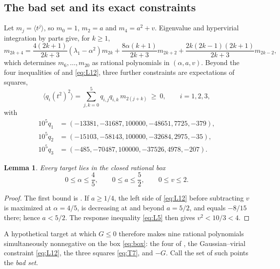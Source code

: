 \documentclass[11pt,reqno]{amsart}
\theoremstyle{plain}
\newtheorem{lemma}[theorem]{Lemma}
\theoremstyle{definition}
\theoremstyle{remark}
\numberwithin{equation}{section}
\begin{document}
\subsection{The bad set and its exact constraints}

Let $m_j=\langle t^j\rangle$, so $m_0=1$, $m_2=a$ and $m_4=a^2+v$.
Eigenvalue and hypervirial integration by parts give, for $k\ge1$,
\begin{equation}
  \label{eq:T5}
  m_{2k+4}=\frac{4(2k+1)}{2k+3}(\lambda_1-\alpha^2)m_{2k}
    +\frac{8\alpha(k+1)}{2k+3}m_{2k+2}
    +\frac{2k(2k-1)(2k+1)}{2k+3}m_{2k-2},
\end{equation}
which determines $m_6,\dots,m_{20}$ as rational polynomials in
$(\alpha,a,v)$. Beyond the four inequalities of  and
\eqref{eq:L12}, three further constraints are expectations of squares,
\begin{equation}
  \label{eq:T7}
  \bigl\langle q_i(t^2)^2\bigr\rangle
  =\sum_{j,k=0}^5q_{i,j}q_{i,k}\,m_{2(j+k)}\ \ge\ 0,
  \qquad i=1,2,3,
\end{equation}
with
\begin{equation}
  \label{eq:qvec}
  \begin{aligned}
    10^5q_1&=(-13381,-31687,100000,-48651,7725,-379),\\
    10^5q_2&=(-15103,-58143,100000,-32684,2975,-35),\\
    10^5q_3&=(-485,-70487,100000,-37526,4978,-207).
  \end{aligned}
\end{equation}

\begin{lemma}
  \label{lem:box}
  Every target lies in the closed rational box
  \begin{equation}
    \label{eq:box}
    0\le\alpha\le\frac45,
    \qquad
    0\le a\le\frac52,
    \qquad
    0\le v\le2 .
  \end{equation}
\end{lemma}

\begin{proof}
  The first bound is . If $a\ge1/4$, the left side of
  \eqref{eq:L12} before subtracting $v$ is maximized at $\alpha=4/5$, is
  decreasing at and beyond $a=5/2$, and equals $-8/15$ there; hence
  $a<5/2$. The response inequality \eqref{eq:L5} then gives
  $v^2<10/3<4$.
\end{proof}

A hypothetical target at which $G\le0$ therefore makes nine rational
polynomials simultaneously nonnegative on the box \eqref{eq:box}: the four
of , the Gaussian--virial constraint \eqref{eq:L12},
the three squares \eqref{eq:T7}, and $-G$. Call the set of such points the
\emph{bad set}.
\end{document}
